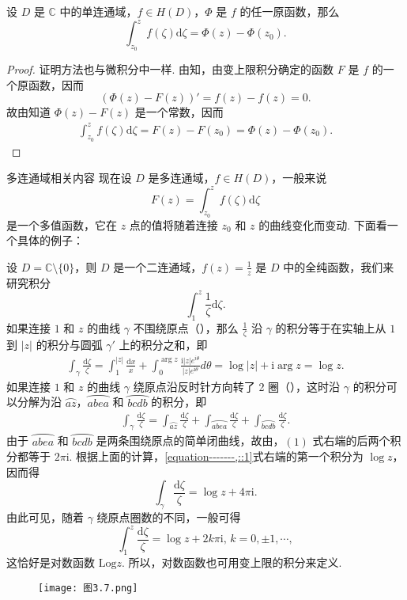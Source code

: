 \documentclass[../../main.tex]{subfiles}
\begin{document}
\begin{theorem}
设 \( D \) 是 \( \mathbb{C} \) 中的单连通域，\( f \in H(D) \)，\( \Phi \) 是 \( f \) 的任一原函数，那么
\[
\int_{z_0}^{z} f(\zeta) \mathrm{d}\zeta  = \Phi(z) - \Phi(z_0).
\]
\end{theorem}
\begin{proof}
证明方法也与微积分中一样. 由知，由变上限积分确定的函数 \( F \) 是 \( f \) 的一个原函数，因而
\[
(\Phi(z) - F(z))' = f(z) - f(z) = 0.
\]
故由知道 \( \Phi(z) - F(z) \) 是一个常数，因而
\begin{align*}
\int_{z_0}^{z} f(\zeta) \mathrm{d}\zeta  = F(z) - F(z_0) = \Phi(z) - \Phi(z_0).
\end{align*}
\end{proof}

多连通域相关内容
现在设 \( D \) 是多连通域，\( f \in H(D) \)，一般来说
\[
F(z) = \int_{z_0}^{z} f(\zeta) \mathrm{d}\zeta 
\]
是一个多值函数，它在 \( z \) 点的值将随着连接 \( z_0 \) 和 \( z \) 的曲线变化而变动. 下面看一个具体的例子：

设 \( D = \mathbb{C} \setminus \{0\} \)，则 \( D \) 是一个二连通域，\( f(z) = \frac{1}{z} \) 是 \( D \) 中的全纯函数，我们来研究积分
\[
\int_{1}^{z} \frac{1}{\zeta} \mathrm{d}\zeta .
\]
如果连接 \( 1 \) 和 \( z \) 的曲线 \( \gamma \) 不围绕原点（），那么 \( \frac{1}{\zeta} \) 沿 \( \gamma \) 的积分等于在实轴上从 \( 1 \) 到 \( |z| \) 的积分与圆弧 \( \gamma' \) 上的积分之和，即
\begin{align*}
\int_{\gamma} \frac{\mathrm{d}\zeta }{\zeta} = \int_{1}^{|z|} \frac{\mathrm{d}x}{x} + \int_{0}^{\arg z} \frac{\mathrm{i}|z|e^{i\theta}}{|z|e^{\mathrm{i}\theta}} d\theta = \log|z| + \mathrm{i}\arg z = \log z.
\end{align*}
如果连接 \( 1 \) 和 \( z \) 的曲线 \( \gamma \) 绕原点沿反时针方向转了 2 圈（），这时沿 \( \gamma \) 的积分可以分解为沿 \( \wideparen{az} \)，\( \wideparen{abea} \) 和 \( \wideparen{bcdb} \) 的积分，即
\begin{align}
\int_{\gamma} \frac{\mathrm{d}\zeta }{\zeta} = \int_{\wideparen{az}} \frac{\mathrm{d}\zeta }{\zeta} + \int_{\wideparen{abea}} \frac{\mathrm{d}\zeta }{\zeta} + \int_{\wideparen{bcdb}} \frac{\mathrm{d}\zeta }{\zeta}. \label{equation-------,::1}
\end{align}
由于 \( \wideparen{abea} \) 和 \( \wideparen{bcdb} \) 是两条围绕原点的简单闭曲线，故由，\((1)\) 式右端的后两个积分都等于 \( 2\pi \mathrm{i} \). 根据上面的计算，\eqref{equation-------,::1}式右端的第一个积分为 \( \log z \)，因而得
\[
\int_{\gamma} \frac{\mathrm{d}\zeta }{\zeta} = \log z + 4\pi \mathrm{i}.
\]
由此可见，随着 \( \gamma \) 绕原点圈数的不同，一般可得
\[
\int_{1}^{z} \frac{\mathrm{d}\zeta }{\zeta} = \log z + 2k\pi \mathrm{i}, \, k = 0, \pm 1, \cdots,
\]
这恰好是对数函数 \( \text{Log} z \). 所以，对数函数也可用变上限的积分来定义. 

\begin{figure}[H]
\centering
\texttt{[image: 图3.7.png]}
\caption{}
\label{figure:图3.7}
\end{figure}
\end{document}
